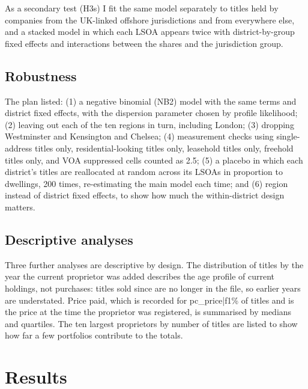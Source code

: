 \documentclass[11pt,a4paper]{article}
\begin{document}
As a secondary test (H3s) I fit the same model separately to titles held by companies from the UK-linked offshore jurisdictions and from everywhere else, and a stacked model in which each LSOA appears twice with district-by-group fixed effects and interactions between the shares and the jurisdiction group.

\subsection{Robustness}
The plan listed: (1) a negative binomial (NB2) model with the same terms and district fixed effects, with the dispersion parameter chosen by profile likelihood; (2) leaving out each of the ten regions in turn, including London; (3) dropping Westminster and Kensington and Chelsea; (4) measurement checks using single-address titles only, residential-looking titles only, leasehold titles only, freehold titles only, and VOA suppressed cells counted as 2.5; (5) a placebo in which each district's titles are reallocated at random across its LSOAs in proportion to dwellings, 200 times, re-estimating the main model each time; and (6) region instead of district fixed effects, to show how much the within-district design matters.

\subsection{Descriptive analyses}
Three further analyses are descriptive by design. The distribution of titles by the year the current proprietor was added describes the age profile of current holdings, not purchases: titles sold since are no longer in the file, so earlier years are understated. Price paid, which is recorded for {{pc_price|f1}}\% of titles and is the price at the time the proprietor was registered, is summarised by medians and quartiles. The ten largest proprietors by number of titles are listed to show how far a few portfolios contribute to the totals.

\section{Results}\label{sec:results}
\end{document}
